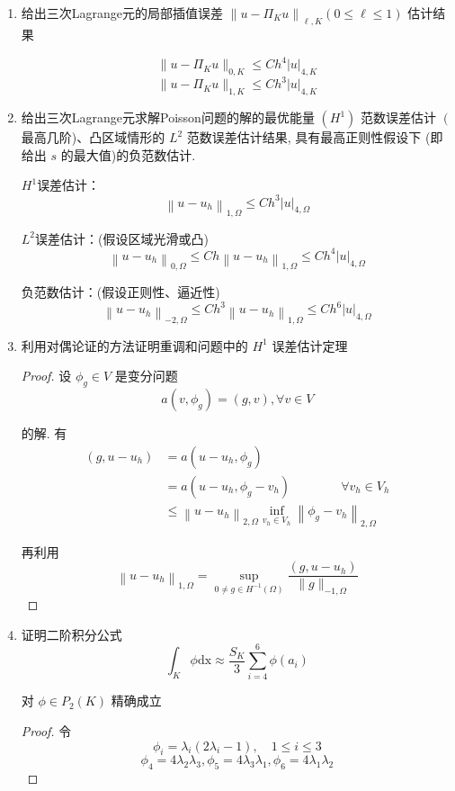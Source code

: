 \documentclass[12pt,a4paper]{article}
\begin{document}
	\begin{enumerate}
		\item 给出三次Lagrange元的局部插值误差 $\left\|u-\Pi_K u\right\|_{\ell, K}(0 \leq \ell \leq 1)$ 估计结果
		
		$$
		\|u - \Pi_K u\|_{0,K} \leq C h^4 |u|_{4,K} $$
		$$
		\|u - \Pi_K u\|_{1,K} \leq C h^3 |u|_{4,K}
		$$
		
		\item 给出三次Lagrange元求解Poisson问题的解的最优能量 $\left(H^1\right)$ 范数误差估计 $\left(\right.$ 最高几阶)、凸区域情形的 $L^2$ 范数误差估计结果, 具有最高正则性假设下 (即给出 $s$ 的最大值)的负范数估计.
		
		$H^1$误差估计：
		$$
		\left\|u-u_h\right\|_{1,\Omega}\leq Ch^3\left|u\right|_{4,\Omega}
		$$
		
		$L^2$误差估计：(假设区域光滑或凸)
		$$
		\left\|u-u_h\right\|_{0,\Omega}\leq Ch\left\|u-u_h\right\|_{1,\Omega}\leq Ch^4\left|u\right|_{4,\Omega}
		$$
		
		负范数估计：(假设正则性、逼近性)
		$$
		\left\|u-u_h\right\|_{-2,\Omega}\leq Ch^{3}\left\|u-u_h\right\|_{1,\Omega}\leq Ch^6\left|u\right|_{4,\Omega}
		$$
		
		\item 利用对偶论证的方法证明重调和问题中的 $H^1$ 误差估计定理
		
		\begin{proof}
			设 $\phi_g \in V$ 是变分问题
			$$
			a\left(v, \phi_g\right)=(g, v), \forall v \in V
			$$
			
			的解. 有
			$$
			\begin{aligned}
				\left(g, u-u_h\right) & =a\left(u-u_h, \phi_g\right) \\
				& = a\left(u-u_h, \phi_g-v_h\right) \qquad \qquad  \forall v_h \in V_h \\
				& \leq\left\|u-u_h\right\|_{2, \Omega} \inf _{v_h \in V_h}\left\|\phi_g-v_h\right\|_{2, \Omega}
			\end{aligned}
			$$
			
			再利用
			$$
			\left\|u-u_h\right\|_{1, \Omega}=\sup _{0 \neq g \in H^{-1}(\Omega)} \frac{\left(g, u-u_h\right)}{\|g\|_{-1, \Omega}}
			$$
		\end{proof}
		
		\item 证明二阶积分公式
		$$
		\int_K \phi \mathrm{dx} \approx \frac{S_K}{3} \sum_{i=4}^6 \phi\left(a_i\right)
		$$
		
		对 $\phi \in P_2(K)$ 精确成立
		
		\begin{proof}
			令
			$$
			\phi_i=\lambda_i(2\lambda_i-1),\quad1\leq i\leq3
			$$	
			$$
			\phi_4=4\lambda_2\lambda_3,\phi_5=4\lambda_3\lambda_1,\phi_6=4\lambda_1\lambda_2
			$$
			

\end{proof}
\end{enumerate}
\end{document}
